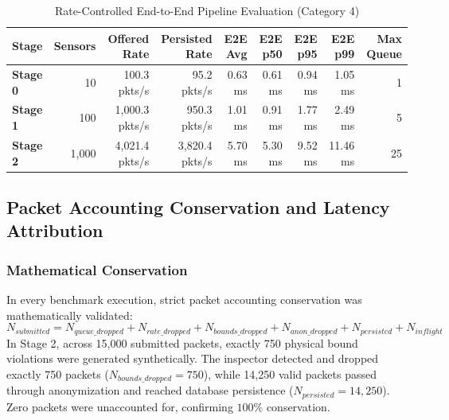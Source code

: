 \begin{table}[H]
\centering
\caption{Rate-Controlled End-to-End Pipeline Evaluation (Category 4)}
\label{tab:e2e_results}
\small
\begin{tabularx}{\linewidth}{@{}l r r r r r r r r@{}}
\toprule
\textbf{Stage} & \textbf{Sensors} & \textbf{Offered Rate} & \textbf{Persisted Rate} & \textbf{E2E Avg} & \textbf{E2E p50} & \textbf{E2E p95} & \textbf{E2E p99} & \textbf{Max Queue} \\
\midrule
\textbf{Stage 0} & 10 & 100.3 pkts/s & 95.2 pkts/s & 0.63 ms & 0.61 ms & 0.94 ms & 1.05 ms & 1 \\
\textbf{Stage 1} & 100 & 1,000.3 pkts/s & 950.3 pkts/s & 1.01 ms & 0.91 ms & 1.77 ms & 2.49 ms & 5 \\
\textbf{Stage 2} & 1,000 & 4,021.4 pkts/s & 3,820.4 pkts/s & 5.70 ms & 5.30 ms & 9.52 ms & 11.46 ms & 25 \\
\bottomrule
\end{tabularx}
\end{table}

\subsection{Packet Accounting Conservation and Latency Attribution}
\subsubsection{Mathematical Conservation}
In every benchmark execution, strict packet accounting conservation was mathematically validated:
\begin{equation}
N_{submitted} = N_{queue\_dropped} + N_{rate\_dropped} + N_{bounds\_dropped} + N_{anon\_dropped} + N_{persisted} + N_{inflight}
\end{equation}
In Stage 2, across 15,000 submitted packets, exactly 750 physical bound violations were generated synthetically. The inspector detected and dropped exactly 750 packets ($N_{bounds\_dropped} = 750$), while 14,250 valid packets passed through anonymization and reached database persistence ($N_{persisted} = 14,250$). Zero packets were unaccounted for, confirming $100\%$ conservation.

